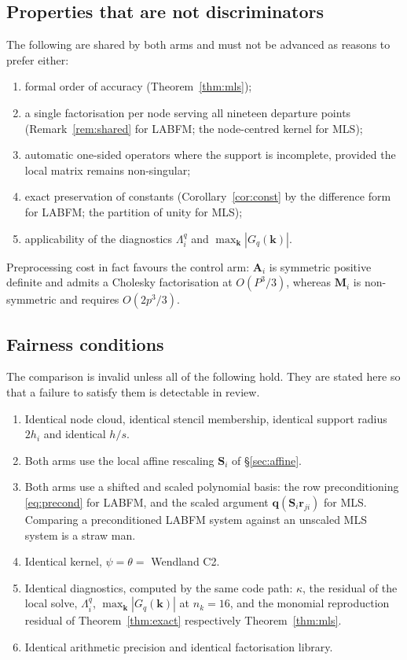 \documentclass[11pt,a4paper]{article}
\newcommand{\rji}{\bm{r}_{ji}}
\begin{document}
\subsection{Properties that are not discriminators}

The following are shared by both arms and must not be advanced as reasons to prefer
either:
\begin{enumerate}[label=(\alph*)]
\item formal order of accuracy (Theorem~\ref{thm:mls});
\item a single factorisation per node serving all nineteen departure points
(Remark~\ref{rem:shared} for LABFM; the node-centred kernel for MLS);
\item automatic one-sided operators where the support is incomplete, provided the
local matrix remains non-singular;
\item exact preservation of constants (Corollary~\ref{cor:const} by the difference
form for LABFM; the partition of unity for MLS);
\item applicability of the diagnostics $\Lambda^{q}_i$ and $\max_{\bm k}|G_q(\bm k)|$.
\end{enumerate}
Preprocessing cost in fact favours the control arm: $\bm A_i$ is symmetric positive
definite and admits a Cholesky factorisation at $O(P^{3}/3)$, whereas $\bm M_i$ is
non-symmetric and requires $O(2p^{3}/3)$.

\subsection{Fairness conditions}
\label{sec:fairness}

The comparison is invalid unless all of the following hold. They are stated here so
that a failure to satisfy them is detectable in review.
\begin{enumerate}[label=(F\arabic*)]
\item Identical node cloud, identical stencil membership, identical support radius
$2h_i$ and identical $h/s$.
\item Both arms use the local affine rescaling $\bm S_i$ of \S\ref{sec:affine}.
\item Both arms use a shifted and scaled polynomial basis: the row preconditioning
\eqref{eq:precond} for LABFM, and the scaled argument $\bm q(\bm S_i\rji)$ for MLS.
Comparing a preconditioned LABFM system against an unscaled MLS system is a straw man.
\item Identical kernel, $\psi=\theta=$ Wendland C2.
\item Identical diagnostics, computed by the same code path: $\kappa$, the residual of
the local solve, $\Lambda^{q}_i$, $\max_{\bm k}|G_q(\bm k)|$ at $n_k=16$, and the
monomial reproduction residual of Theorem~\ref{thm:exact}
respectively Theorem~\ref{thm:mls}.
\item Identical arithmetic precision and identical factorisation library.
\end{enumerate}
\end{document}
